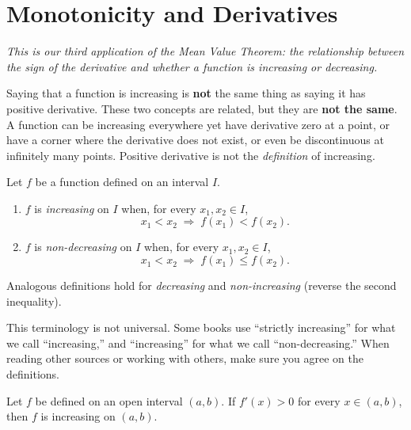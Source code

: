 \section{Monotonicity and Derivatives}
\label{sec:5.11}

\textit{This is our third application of the Mean Value Theorem: the relationship between the sign of the derivative and whether a function is increasing or decreasing.}

\begin{remark}[Warning]
Saying that a function is increasing is \textbf{not} the same thing as saying it has positive derivative.  These two concepts are related, but they are \textbf{not the same}.  A function can be increasing everywhere yet have derivative zero at a point, or have a corner where the derivative does not exist, or even be discontinuous at infinitely many points.  Positive derivative is not the \emph{definition} of increasing.
\end{remark}

\begin{definition}
\label{def:5-4}
Let $f$ be a function defined on an interval $I$.
\begin{enumerate}[label=(\roman*)]
  \item $f$ is \emph{increasing} on $I$ when, for every $x_{1}, x_{2} \in I$,
  \[
    x_{1} < x_{2} \;\Longrightarrow\; f(x_{1}) < f(x_{2}).
  \]
  \item $f$ is \emph{non-decreasing} on $I$ when, for every $x_{1}, x_{2} \in I$,
  \[
    x_{1} < x_{2} \;\Longrightarrow\; f(x_{1}) \leq f(x_{2}).
  \]
\end{enumerate}
Analogous definitions hold for \emph{decreasing} and \emph{non-increasing} (reverse the second inequality).
\end{definition}

\begin{remark}
This terminology is not universal.  Some books use ``strictly increasing'' for what we call ``increasing,'' and ``increasing'' for what we call ``non-decreasing.''  When reading other sources or working with others, make sure you agree on the definitions.
\end{remark}

\begin{theorem}
\label{thm:5-9}
Let $f$ be defined on an open interval $(a,b)$.  If $f'(x) > 0$ for every $x \in (a,b)$, then $f$ is increasing on $(a,b)$.
\end{theorem}

